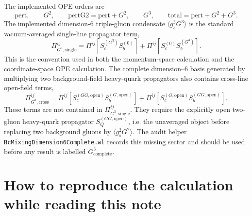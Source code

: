 \documentclass[11pt]{article}
\begin{document}
The implemented OPE orders are
\begin{equation}
  \text{pert},\qquad G^2,\qquad \text{pertG2}=\text{pert}+G^2,
  \qquad G^3,\qquad \text{total}=\text{pert}+G^2+G^3.
\end{equation}
The implemented dimension-6 triple-gluon condensate
$\langle g_s^3G^3\rangle$ is the standard vacuum-averaged single-line
propagator term,
\begin{equation}
  \Pi^{ij}_{G^3,\mathrm{single}}
  =
  \Pi^{ij}\!\left[S_c^{(G^3)}S_b^{(0)}\right]
  +
  \Pi^{ij}\!\left[S_c^{(0)}S_b^{(G^3)}\right].
\end{equation}
This is the convention used in both the momentum-space calculation and the
coordinate-space OPE calculation.  The complete dimension--6 basis generated
by multiplying two background-field heavy-quark propagators also contains
cross-line open-field terms,
\begin{equation}
  \Pi^{ij}_{G^3,\mathrm{cross}}
  =
  \Pi^{ij}\!\left[
    S_c^{(GG,\mathrm{open})}S_b^{(G,\mathrm{open})}
  \right]
  +
  \Pi^{ij}\!\left[
    S_c^{(G,\mathrm{open})}S_b^{(GG,\mathrm{open})}
  \right].
\end{equation}
These terms are not contained in
\(\Pi^{ij}_{G^3,\mathrm{single}}\).  They require the explicitly open
two-gluon heavy-quark propagator \(S_Q^{(GG,\mathrm{open})}\), i.e. the
unaveraged object before replacing two background gluons by
\(\langle g_s^2G^2\rangle\).  The audit helper
\texttt{BcMixingDimension6Complete.wl} records this missing sector and should
be used before any result is labelled \(G^3_{\mathrm{complete}}\).

\section{How to reproduce the calculation while reading this note}
\end{document}
